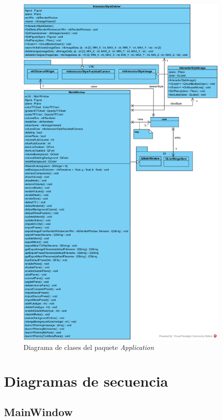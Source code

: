 \begin{figure}[H]
	\centering
	\includegraphics[width=10.5cm]{imagenes/diagramas/clases/Application}
	\caption{Diagrama de clases del paquete \textit{Application}}
	\label{fig:diagrama_clases_application}
\end{figure}

\section{Diagramas de secuencia}

\subsection{MainWindow}

